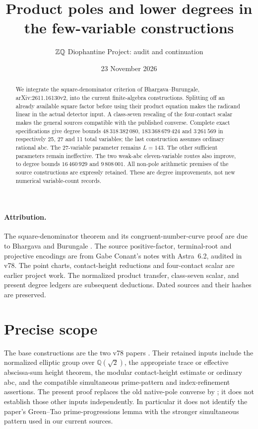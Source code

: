 \documentclass[11pt]{article}
\title{Product poles and lower degrees in the few-variable constructions}
\author{\(\Z\Q\) Diophantine Project: audit and continuation}
\date{23 November 2026}
\newcommand{\Q}{\mathbb Q}\newcommand{\Z}{\mathbb Z}
\begin{document}
\maketitle
\begin{abstract}
We integrate the square-denominator criterion of Bhargava--Burungale,
arXiv:2611.16130v2, into the current finite-algebra constructions. Splitting
off an already available square factor before using their product equation
makes the radicand linear in the actual detector input. A class-seven
rescaling of the four-contact scalar makes the general sources compatible
with the published converse. Complete exact specifications give degree
bounds $48\,318\,382\,080$, $183\,368\,679\,424$ and $3\,261\,569$
in respectively 25, 27 and 11 total variables; the last construction
assumes ordinary rational abc. The 27-variable parameter remains $L=143$.
The other sufficient parameters remain ineffective. The two weak-abc
eleven-variable routes also improve, to degree bounds $16\,460\,929$
and $9\,808\,001$. All non-pole arithmetic
premises of the source constructions are expressly retained. These are
degree improvements, not new numerical variable-count records.
\end{abstract}

\paragraph{Attribution.}
The square-denominator theorem and its congruent-number-curve proof are
due to Bhargava and Burungale \cite{BB}. The source positive-factor,
terminal-root and projective encodings are from Gabe Conant's notes with
Astra~6.2, audited in v78. The point charts, contact-height reductions and
four-contact scalar are earlier project work. The normalized product
transfer, class-seven scalar, and present degree ledgers are subsequent
deductions. Dated sources and their hashes are preserved.

\section{Precise scope}
The base constructions are the two v78 papers \cite{scalar,twelve}.
Their retained inputs include the normalized elliptic group over
$\Q(\sqrt2)$, the appropriate trace or effective abscissa-sum height
theorem, the modular contact-height estimate or ordinary abc, and the
compatible simultaneous prime-pattern and index-refinement assertions.
The present proof replaces the old native-pole converse by
\cite[Lemma 2.2]{BB}; it does not establish those other inputs independently.
In particular it does not identify the paper's Green--Tao prime-progressions
lemma with the stronger simultaneous pattern used in our current sources.
\end{document}
